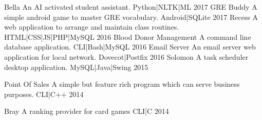 

\begin{cvprojects}
  \cvproject
    {Bella}%
    {An AI activated student assistant.}%
    {Python|NLTK|ML}%
    {2017}%
  \cvproject
    {GRE Buddy}
    {A simple android game to master GRE vocabulary.}
    {Android|SQLite}
    {2017}
  \cvproject
    {Recess}
    {A web application to arrange and maintain class routines.}
    {HTML|CSS|JS|PHP|MySQL}
    {2016}
  \cvproject
    {Blood Donor Management}
    {A command line database application.}
    {CLI|Bash|MySQL}
    {2016}
  \cvproject
    {Email Server}
    {An email server web application for local network.}
    {Dovecot|Postfix}
    {2016}
  \cvproject
    {Solomon}
    {A task scheduler desktop application.}
    {MySQL|Java|Swing}
    {2015}

  \cvproject
    {Point Of Sales}
    {A simple but feature rich program which can serve business purposes.}
    {CLI|C++}
    {2014}

  \cvproject
    {Bray}
    {A ranking provider for card games }
    {CLI|C}
    {2014}
\end{cvprojects}